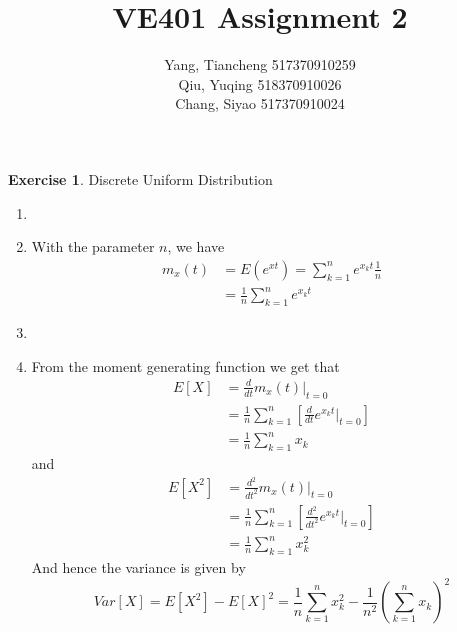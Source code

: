 \documentclass[12pt,a4paper]{article}
\makeatletter
\theoremstyle{definition}
\newtheorem{exercise}{Exercise}
\newtheorem*{solution}{Solution}
\renewenvironment{solution}[1][Solution] {\par\pushQED{\qed}\normalfont\topsep6\p@\@plus6\p@\relax\trivlist\item[\hskip\labelsep\bfseries#1\@addpunct{.}]\ignorespaces}{\popQED\endtrivlist\@endpefalse} \makeatother
\makeatother
\begin{document}
\title{VE401 Assignment 2}
\author{Yang, Tiancheng 517370910259\\Qiu, Yuqing 518370910026\\Chang, Siyao 517370910024}

\maketitle

\newpage

\begin{exercise}
Discrete Uniform Distribution
\begin{enumerate}[label=\roman*)]
    \item 
    \begin{solution}
            With the parameter $n$, we have
            \begin{equation*}
                \begin{split}
                m_x(t)&=E(e^{xt})=\sum_{k=1}^{n} e^{x_k t}\frac{1}{n}\\
                &=\frac{1}{n}\sum_{k=1}^{n} e^{x_k t}
                \end{split}
            \end{equation*}
    \end{solution}
    \item \begin{solution}
        From the moment generating function we get that
        \begin{equation*}
            \begin{split}
            E[X]&=\frac{d}{dt}m_x(t)|_{t=0}\\
            &=\frac{1}{n}\sum_{k=1}^n [\frac{d}{dt}e^{x_k t}|_{t=0}]\\
            &=\frac{1}{n}\sum_{k=1}^n x_k
            \end{split}
        \end{equation*}
        and
        \begin{equation*}
            \begin{split}
            E[X^2]&=\frac{d^2}{dt^2}m_x(t)|_{t=0}\\
            &=\frac{1}{n}\sum_{k=1}^n[\frac{d^2}{dt^2}e^{x_k t}|_{t=0}]\\
            &=\frac{1}{n}\sum_{k=1}^n x_k^2
            \end{split}
        \end{equation*}
        And hence the variance is given by
        \begin{equation*}
            Var[X]=E[X^2]-E[X]^2=\frac{1}{n}\sum_{k=1}^n x_k^2-\frac{1}{n^2}(\sum_{k=1}^n x_k)^2
        \end{equation*}
    \end{solution}
\end{enumerate}
\end{exercise}
\end{document}
